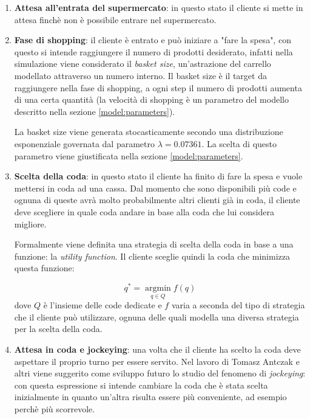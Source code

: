 \begin{enumerate}
	\item \textbf{Attesa all'entrata del supermercato}: in questo stato il cliente si mette in attesa finchè non è possibile entrare nel supermercato. 
	\item \textbf{Fase di shopping}: il cliente è entrato e può iniziare a "fare la spesa", con questo si intende raggiungere il numero di prodotti desiderato, infatti nella simulazione viene considerato il \textit{basket size}, un'astrazione del carrello modellato attraverso un numero interno. Il basket size è il target da raggiungere nella fase di shopping, a ogni step il numero di prodotti aumenta di una certa quantità (la velocità di shopping è un parametro del modello descritto nella sezione \ref{model:parameters}). 
	
	La basket size viene generata stocasticamente secondo una distribuzione esponenziale governata dal parametro $\lambda = 0.07361$. La scelta di questo parametro viene giustificata nella sezione \ref{model:parameters}. 
	
	\item \textbf{Scelta della coda}: in questo stato il cliente ha finito di fare la spesa e vuole mettersi in coda ad una cassa. Dal momento che sono disponibili più code e ognuna di queste avrà molto probabilmente altri clienti già in coda, il cliente deve scegliere in quale coda andare in base alla coda che lui considera migliore.
	
	Formalmente viene definita una strategia di scelta della coda in base a una funzione: la \textit{utility function}. Il cliente sceglie quindi la coda che minimizza questa funzione:

	\begin{equation}
		q^* = \operatorname*{argmin}_{q \in Q} f(q) \label{eq:strategy}
	\end{equation}
	dove $Q$ è l'insieme delle code dedicate e $f$ varia a seconda del tipo di strategia che il cliente può utilizzare, ognuna delle quali modella una diversa strategia per la scelta della coda.

	\item \textbf{Attesa in coda e jockeying}: una volta che il cliente ha scelto la coda deve aspettare il proprio turno per essere servito. Nel lavoro di Tomasz Antczak e altri \cite{article1} viene suggerito come sviluppo futuro lo studio del fenomeno di \textit{jockeying}: con questa espressione si intende cambiare la coda che è stata scelta inizialmente in quanto un'altra risulta essere più conveniente, ad esempio perchè più scorrevole.
	

\end{enumerate}

